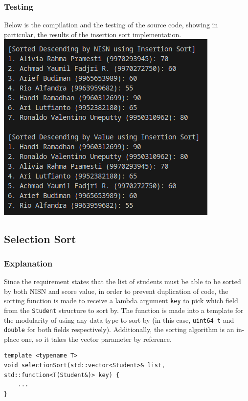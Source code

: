 \documentclass[12pt]{article}
\begin{document}
\subsubsection{Testing}
Below is the compilation and the testing of the source code, showing in particular, the results of the insertion sort implementation.
\newline\includegraphics[width=\textwidth]{01_sort_search_insertion}

\subsection{Selection Sort}

\subsubsection{Explanation}

Since the requirement states that the list of students must be able to be sorted by both NISN and score value, in order to prevent duplication of code, the sorting function is made to receive a lambda argument \texttt{key} to pick which field from the \texttt{Student} structure to sort by. The function is made into a template for the modularity of using any data type to sort by (in this case, \texttt{uint64\_t} and \texttt{double} for both fields respectively). Additionally, the sorting algorithm is an in-place one, so it takes the vector parameter by reference.

\begin{verbatim}
template <typename T>
void selectionSort(std::vector<Student>& list, std::function<T(Student&)> key) {
    ...
}
\end{verbatim}
\end{document}
